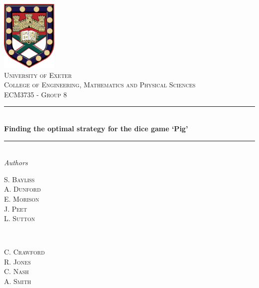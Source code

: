 \documentclass[a4paper,titlepage]{article}
\begin{document}
\begin{titlepage}
	\newcommand{\HRule}{\rule{\linewidth}{0.5mm}}
	\center


	\includegraphics[width=0.2\textwidth]{Crest.jpg}\\[1cm]


	\textsc{\LARGE University of Exeter}\\[1.5cm]

	\textsc{\Large College of Engineering, Mathematics and Physical Sciences}\\[0.5cm]

	\textsc{\large ECM3735 - Group 8}\\[0.5cm]


	\HRule\\[0.4cm]

	{\huge\bfseries Finding the optimal strategy for the dice game `Pig'}\\[0.4cm]

	\HRule\\[1.5cm]


	\LARGE\textit{Authors}\\
	\begin{minipage}{0.4\textwidth}
		\begin{flushleft}
			\large
			S. \textsc{Bayliss}\\
			A. \textsc{Dunford}\\
			E. \textsc{Morison}\\
			J. \textsc{Peet}\\
			L. \textsc{Sutton}
		\end{flushleft}
	\end{minipage}
	~
	\begin{minipage}{0.4\textwidth}
		\begin{flushright}
			\large
			C. \textsc{Crawford}\\
			R. \textsc{Jones}\\
			C. \textsc{Nash}\\
			A. \textsc{Smith}
			\vspace*{10pt§}
		\end{flushright}
	\end{minipage}


\end{titlepage}
\end{document}
